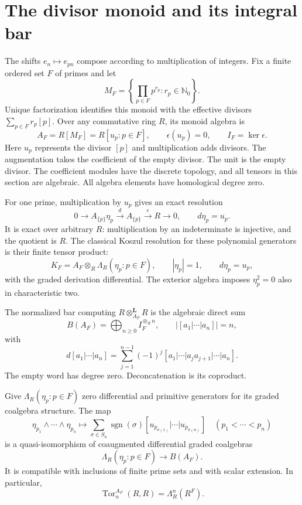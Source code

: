 \section{The divisor monoid and its integral bar}
\label{sec:divisor-bar}

The shifts $e_n\mapsto e_{pn}$ compose according to multiplication of
integers.  Fix a finite ordered set $F$ of primes and let
\[
 M_F=\left\{\prod_{p\in F}p^{r_p}:r_p\in\mathbb N_0\right\}.
\]
Unique factorization identifies this monoid with the effective divisors
$\sum_{p\in F}r_p[p]$.  Over any commutative ring $R$, its monoid algebra is
\[
 A_F=R[M_F]=R[u_p:p\in F],\qquad
 \epsilon(u_p)=0,\qquad I_F=\ker\epsilon.
\]
Here $u_p$ represents the divisor $[p]$ and multiplication adds divisors.
The augmentation takes the coefficient of the empty divisor.
The unit is the empty divisor. The coefficient modules have the discrete
topology, and all tensors in this section are algebraic.  All algebra
elements have homological degree zero.

For one prime, multiplication by $u_p$ gives an exact resolution
\[
 0\longrightarrow A_{\{p\}}\eta_p
 \xrightarrow{\ d\ }A_{\{p\}}
 \xrightarrow{\epsilon}R\longrightarrow0,
 \qquad d\eta_p=u_p.
\]
It is exact over arbitrary $R$: multiplication by an indeterminate is
injective, and the quotient is $R$.  The classical Koszul resolution for these polynomial generators is their
finite tensor product:
\[
 K_F=A_F\otimes_R\Lambda_R(\eta_p:p\in F),\qquad |\eta_p|=1,
 \qquad d\eta_p=u_p,
\]
with the graded derivation differential.  The exterior algebra imposes
$\eta_p^2=0$ also in characteristic two.

The normalized bar computing $R\otimes_{A_F}^{\mathbf L}R$ is the
algebraic direct sum
\[
 B(A_F)=\bigoplus_{n\geq0}I_F^{\otimes_R n},
 \qquad |[a_1|\cdots|a_n]|=n,
\]
with
\[
 d[a_1|\cdots|a_n]
 =\sum_{j=1}^{n-1}(-1)^j
       [a_1|\cdots|a_ja_{j+1}|\cdots|a_n].
\]
The empty word has degree zero.  Deconcatenation is its coproduct.

\begin{proposition}
\label{prop:divisor-bar}
Give $\Lambda_R(\eta_p:p\in F)$ zero differential and primitive generators
for its graded coalgebra structure.  The map
\[
 \eta_{p_1}\wedge\cdots\wedge\eta_{p_n}
 \longmapsto
 \sum_{\sigma\in S_n}\operatorname{sgn}(\sigma)
       [u_{p_{\sigma(1)}}|\cdots|u_{p_{\sigma(n)}}]
 \quad(p_1<\cdots<p_n)
\]
is a quasi-isomorphism of coaugmented differential graded coalgebras
\[
 \Lambda_R(\eta_p:p\in F)\longrightarrow B(A_F).
\]
It is compatible with inclusions of finite prime sets and with scalar
extension.  In particular,
\[
 \operatorname{Tor}^{A_F}_n(R,R)=\Lambda_R^n(R^F).
\]
\end{proposition}

